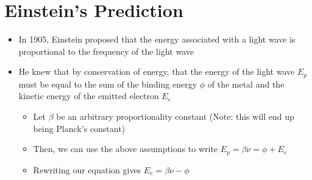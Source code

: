 \documentclass[a4paper]{article}
\begin{document}
	\section*{Einstein's Prediction}
		\begin{itemize}
			\item In 1905, Einstein proposed that the energy associated with a light wave is proportional to the frequency of the light wave 
			\item He knew that by conservation of energy, that the energy of the light wave $E_p$ must be equal to the sum of the binding energy $\phi$ of the metal and the kinetic energy of the emitted electron $E_e$ 
				\begin{itemize}
					\item Let $\beta$ be an arbitrary proportionality constant (Note: this will end up being Planck's constant)
					\item Then, we can use the above assumptions to write $E_p = \beta \nu = \phi + E_e$
					\item Rewriting our equation gives $\boxed{E_e = \beta \nu - \phi}$
				\end{itemize}
		\end{itemize}			
\end{document}
